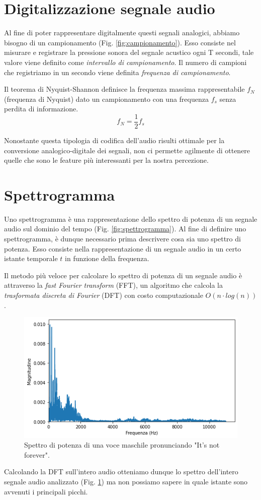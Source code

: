 		\section{Digitalizzazione segnale audio}
			Al fine di poter rappresentare digitalmente questi segnali analogici, abbiamo bisogno di un campionamento (Fig. \ref{fig:campionamento}).
			Esso consiste nel misurare e registrare la pressione sonora del segnale acustico ogni T secondi, tale valore viene definito come \textit{intervallo di campionamento}. Il numero di campioni che registriamo in un secondo viene definita \textit{frequenza di campionamento}.
			
			Il teorema di Nyquist-Shannon definisce la frequenza massima rappresentabile $f_{N}$ (frequenza di Nyquist) dato un campionamento con una frequenza $f_{s}$ senza perdita di informazione.
			\begin{equation}
				f_{N} = \frac{1}{2} f_{s}
				\label{eq:fn}
			\end{equation}
			
			Nonostante questa tipologia di codifica dell'audio risulti ottimale per la conversione analogico-digitale dei segnali, non ci permette agilmente di ottenere quelle che sono le feature più interessanti per la nostra percezione.
			
			
		\section{Spettrogramma}
		Uno spettrogramma è una rappresentazione dello spettro di potenza di un segnale audio sul dominio del tempo (Fig. \ref{fig:spettrogramma}). Al fine di definire uno spettrogramma, è dunque necessario prima descrivere cosa sia uno spettro di potenza. Esso consiste nella rappresentazione di un segnale audio in un certo istante temporale $t$ in funzione della frequenza.
				
		Il metodo più veloce per calcolare lo spettro di potenza di un segnale audio è attraverso la \textit{fast Fourier transform} (FFT), un algoritmo che calcola la \textit{trasformata discreta di Fourier} (DFT) con costo computazionale $O(n \cdot log(n))$\cite{audio-fft}.
		\begin{figure}[h]
			\centering
			\includegraphics[width=0.75\linewidth]{figures/spectrum}
			\caption{Spettro di potenza di una voce maschile pronunciando "It's not forever".}
			\label{fig:spettro}
		\end{figure}
		Calcolando la DFT sull'intero audio otteniamo dunque lo spettro dell'intero segnale audio analizzato (Fig. \ref{fig:spettro}) ma non possiamo sapere in quale istante sono avvenuti i principali picchi.
		
